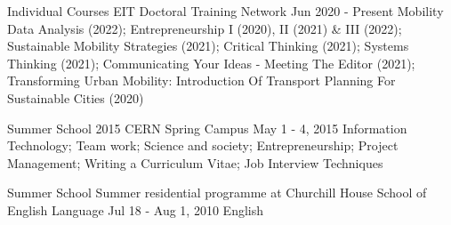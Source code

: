 

\begin{cventries}
  \cventryshort
    {Individual Courses} %
    {EIT Doctoral Training Network} %
    {Jun 2020 - Present} %
    {} %
    {
    Mobility Data Analysis (2022);
    Entrepreneurship I (2020), II (2021) \& III (2022);
    Sustainable Mobility Strategies (2021);
    Critical Thinking (2021); 
    Systems Thinking (2021); 
    Communicating Your Ideas - Meeting The Editor (2021);
    Transforming Urban Mobility: Introduction Of Transport Planning For Sustainable Cities (2020) 
    }
    
  \cventryshort
    {Summer School} %
    {2015 CERN Spring Campus} %
    {May 1 - 4, 2015} %
    {} %
    {
    Information Technology; 
    Team work;
    Science and society;
    Entrepreneurship;
    Project Management;
    Writing a Curriculum Vitae;
    Job Interview Techniques
    }

  \cventryshort
    {Summer School} %
    {Summer residential programme at Churchill House School of English Language} %
    {Jul 18 - Aug 1, 2010} %
    {} %
    {
    English
    }

\end{cventries}
